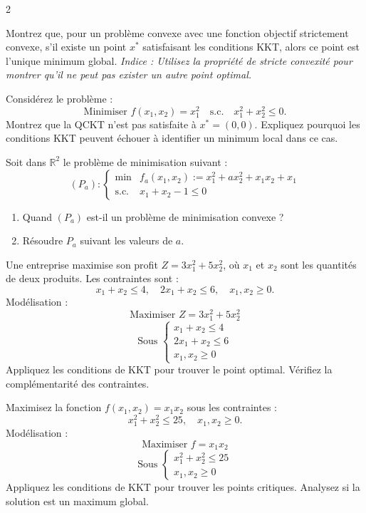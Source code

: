 \begin{multicols}{2}
\begin{exo}
	Montrez que, pour un problème convexe avec une fonction objectif strictement convexe, s'il existe un point \( x^* \) satisfaisant les conditions KKT, alors ce point est l'unique minimum global. \textit{Indice : Utilisez la propriété de stricte convexité pour montrer qu'il ne peut pas exister un autre point optimal.}
\end{exo}

\begin{exo}
	Considérez le problème :
	\[
	\text{Minimiser } f(x_1, x_2) = x_1^2 \quad \text{s.c.} \quad x_1^2 + x_2^2 \leq 0.
	\]
	Montrez que la QCKT n'est pas satisfaite à \( x^* = (0, 0) \). Expliquez pourquoi les conditions KKT peuvent échouer à identifier un minimum local dans ce cas.
\end{exo}

\begin{exo}
	Soit dans \( \mathbb{R}^2 \) le problème de minimisation suivant :
	\[
	(P_a) :
	\left\lbrace \begin{array}{ll}
	\min & f_a(x_1, x_2) := x_1^2 + a x_2^2 + x_1x_2 + x_1 \\
	\text{s.c.} & x_1 + x_2 - 1 \leq 0
	\end{array}\right.
	\]
	\begin{enumerate}[label=\arabic*.,leftmargin=*]
		\item Quand \( (P_a) \) est-il un problème de minimisation convexe ?
		\item Résoudre \( P_a \) suivant les valeurs de \( a \).
	\end{enumerate}
\end{exo}

\begin{exo}
	Une entreprise maximise son profit \( Z = 3x_1^2 + 5x_2^2 \), où \( x_1 \) et \( x_2 \) sont les quantités de deux produits. Les contraintes sont :
	\[
	x_1 + x_2 \leq 4, \quad 2x_1 + x_2 \leq 6, \quad x_1, x_2 \geq 0.
	\]
	Modélisation :
	\[
	\text{Maximiser } Z = 3x_1^2 + 5x_2^2
	\]
	\[
	\text{Sous } \begin{cases}
	x_1 + x_2 \leq 4 \\
	2x_1 + x_2 \leq 6 \\
	x_1, x_2 \geq 0
	\end{cases}
	\]
	Appliquez les conditions de KKT pour trouver le point optimal. Vérifiez la complémentarité des contraintes.
\end{exo}

\begin{exo}
	Maximisez la fonction \( f(x_1, x_2) = x_1 x_2 \) sous les contraintes :
	\[
	x_1^2 + x_2^2 \leq 25, \quad x_1, x_2 \geq 0.
	\]
	Modélisation :
	\[
	\text{Maximiser } f = x_1 x_2
	\]
	\[
	\text{Sous } \begin{cases}
	x_1^2 + x_2^2 \leq 25 \\
	x_1, x_2 \geq 0
	\end{cases}
	\]
	Appliquez les conditions de KKT pour trouver les points critiques. Analysez si la solution est un maximum global.
\end{exo}


\end{multicols}
